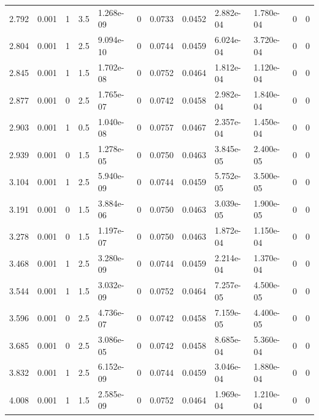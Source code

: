 \documentclass[preview]{standalone}
\begin{document}
{{\begin{tabular}{L{1.2cm}C{1.2cm} C{0.3cm}C{0.5cm} C{1.4cm}C{1.4cm} C{1.4cm}C{1.4cm} C{1.6cm}C{1.6cm} C{1.6cm}C{1.6cm}}
  2.792  &  0.001  & 1     & 3.5 &  1.268e-09  & 0  &  0.0733&   0.0452& 2.882e-04 & 1.780e-04   &  0 & 0  \\ 
  2.804  &  0.001  & 1     & 2.5 &  9.094e-10  & 0  &  0.0744&   0.0459& 6.024e-04 & 3.720e-04   &  0 & 0  \\ 
  2.845  &  0.001  & 1     & 1.5 &  1.702e-08  & 0  &  0.0752&   0.0464& 1.812e-04 & 1.120e-04   &  0 & 0  \\ 
  2.877  &  0.001  & 0     & 2.5 &  1.765e-07  & 0  &  0.0742&   0.0458& 2.982e-04 & 1.840e-04   &  0 & 0  \\ 
  2.903  &  0.001  & 1     & 0.5 &  1.040e-08  & 0  &  0.0757&   0.0467& 2.357e-04 & 1.450e-04   &  0 & 0  \\ 
  2.939  &  0.001  & 0     & 1.5 &  1.278e-05  & 0  &  0.0750&   0.0463& 3.845e-05 & 2.400e-05   &  0 & 0  \\ 
  3.104  &  0.001  & 1     & 2.5 &  5.940e-09  & 0  &  0.0744&   0.0459& 5.752e-05 & 3.500e-05   &  0 & 0  \\ 
  3.191  &  0.001  & 0     & 1.5 &  3.884e-06  & 0  &  0.0750&   0.0463& 3.039e-05 & 1.900e-05   &  0 & 0  \\ 
  3.278  &  0.001  & 0     & 1.5 &  1.197e-07  & 0  &  0.0750&   0.0463& 1.872e-04 & 1.150e-04   &  0 & 0  \\ 
  3.468  &  0.001  & 1     & 2.5 &  3.280e-09  & 0  &  0.0744&   0.0459& 2.214e-04 & 1.370e-04   &  0 & 0  \\ 
  3.544  &  0.001  & 1     & 1.5 &  3.032e-09  & 0  &  0.0752&   0.0464& 7.257e-05 & 4.500e-05   &  0 & 0  \\ 
  3.596  &  0.001  & 0     & 2.5 &  4.736e-07  & 0  &  0.0742&   0.0458& 7.159e-05 & 4.400e-05   &  0 & 0  \\ 
  3.685  &  0.001  & 0     & 2.5 &  3.086e-05  & 0  &  0.0742&   0.0458& 8.685e-04 & 5.360e-04   &  0 & 0  \\ 
  3.832  &  0.001  & 1     & 2.5 &  6.152e-09  & 0  &  0.0744&   0.0459& 3.046e-04 & 1.880e-04   &  0 & 0  \\ 
  4.008  &  0.001  & 1     & 1.5 &  2.585e-09  & 0  &  0.0752&   0.0464& 1.969e-04 & 1.210e-04   &  0 & 0  \\ 
\hline 
\end{tabular} 

}}
\end{document}
